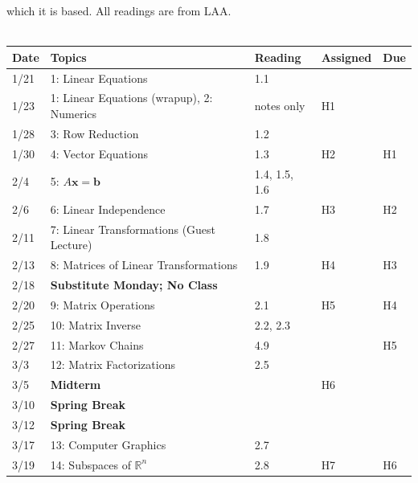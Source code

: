 \documentclass[11pt]{article}
\begin{document}
which it is based.   All readings are from LAA.
\\~\\
\small
\begin{centering}
\begin{tabular}{||l|p{3in}|l|l|l||}
\hline\hline
Date & Topics  & Reading & Assigned & Due  \\
\hline\hline
1/21 & 1: Linear Equations & 1.1 & & \\
1/23& 1: Linear Equations (wrapup), 2: Numerics &  notes only &  H1 & \\
\hline

1/28 &  3: Row Reduction & 1.2 &  & \\
1/30 & 4: Vector Equations  & 1.3 &  H2 & H1 \\
\hline

2/4 & 5: $A\mathbf{x} =\mathbf{b}$   & 1.4, 1.5, 1.6 &  & \\ %
2/6 & 6: Linear Independence  & 1.7 & H3 & H2 \\
\hline

2/11 & 7: Linear Transformations  (Guest Lecture) &  1.8 & & \\ 
2/13 & 8: Matrices of Linear Transformations & 1.9 & H4 & H3 \\  
\hline

2/18 & \textbf{Substitute Monday; No Class} &&&\\
2/20 &9: Matrix Operations   & 2.1 &  H5 &  H4 \\ 
\hline

2/25 & 10: Matrix Inverse  & 2.2, 2.3 &  &  \\   
2/27 & 11: Markov Chains  &4.9 &  & H5 \\ %
\hline

% 
3/3 & 12: Matrix Factorizations  & 2.5 & &  \\ 
3/5 &  \textbf{Midterm} & &  H6 &  \\ 
  \hline

  3/10 & \textbf{Spring Break} &&& \\
  3/12 & \textbf{Spring Break} &&& \\
  \hline

3/17 & 13: Computer Graphics  & 2.7 & & \\ 
3/19 & 14: Subspaces of $\mathbb{R}^n$  & 2.8 & H7 & H6\\ 
\hline


\end{tabular}
\end{centering}
\end{document}
